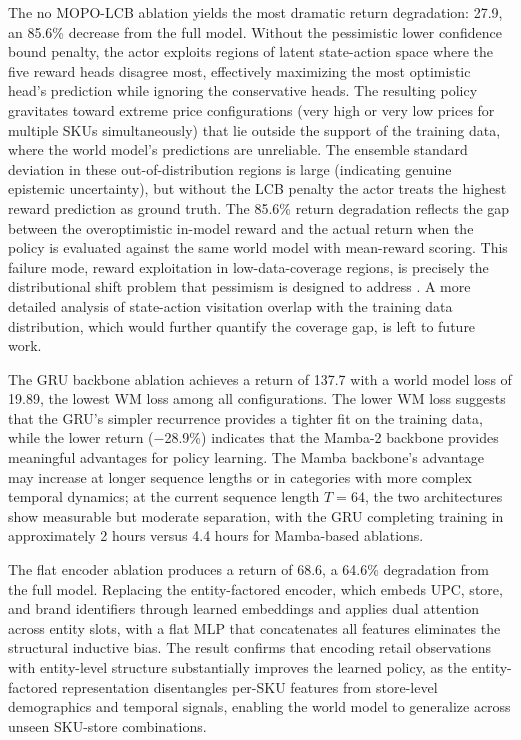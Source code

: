 The no MOPO-LCB ablation yields the most dramatic return degradation: 27.9, an 85.6\% decrease from the full model. Without the pessimistic lower confidence bound penalty, the actor exploits regions of latent state-action space where the five reward heads disagree most, effectively maximizing the most optimistic head's prediction while ignoring the conservative heads. The resulting policy gravitates toward extreme price configurations (very high or very low prices for multiple SKUs simultaneously) that lie outside the support of the training data, where the world model's predictions are unreliable. The ensemble standard deviation in these out-of-distribution regions is large (indicating genuine epistemic uncertainty), but without the LCB penalty the actor treats the highest reward prediction as ground truth. The 85.6\% return degradation reflects the gap between the overoptimistic in-model reward and the actual return when the policy is evaluated against the same world model with mean-reward scoring. This failure mode, reward exploitation in low-data-coverage regions, is precisely the distributional shift problem that pessimism is designed to address \citep{yu2020mopo, levine2020offline}. A more detailed analysis of state-action visitation overlap with the training data distribution, which would further quantify the coverage gap, is left to future work.

The GRU backbone ablation achieves a return of 137.7 with a world model loss of 19.89, the lowest WM loss among all configurations. The lower WM loss suggests that the GRU's simpler recurrence provides a tighter fit on the training data, while the lower return ($-$28.9\%) indicates that the Mamba-2 backbone provides meaningful advantages for policy learning. The Mamba backbone's advantage may increase at longer sequence lengths or in categories with more complex temporal dynamics; at the current sequence length $T = 64$, the two architectures show measurable but moderate separation, with the GRU completing training in approximately 2 hours versus 4.4 hours for Mamba-based ablations.

The flat encoder ablation produces a return of 68.6, a 64.6\% degradation from the full model. Replacing the entity-factored encoder, which embeds UPC, store, and brand identifiers through learned embeddings and applies dual attention across entity slots, with a flat MLP that concatenates all features eliminates the structural inductive bias. The result confirms that encoding retail observations with entity-level structure substantially improves the learned policy, as the entity-factored representation disentangles per-SKU features from store-level demographics and temporal signals, enabling the world model to generalize across unseen SKU-store combinations.

